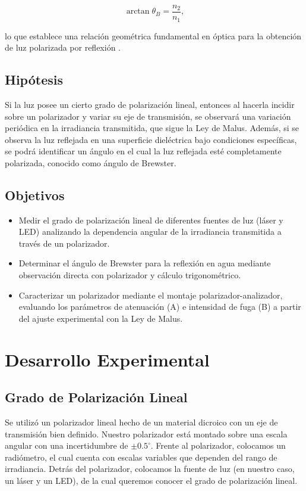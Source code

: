 \documentclass[article,12pt]{elsarticle}
\begin{document}
\begin{mdframed}
\begin{equation}
    \arctan \theta_B = \frac{n_2}{n_1},
\end{equation}
\end{mdframed}

lo que establece una relación geométrica fundamental en óptica para la obtención de luz polarizada por reflexión \cite{griffiths1999, Polarizacion}.

\subsection{Hipótesis}
Si la luz posee un cierto grado de polarización lineal, entonces al hacerla incidir sobre un polarizador y variar su eje de transmisión, se observará una variación periódica en la irradiancia transmitida, que sigue la Ley de Malus. Además, si se observa la luz reflejada en una superficie dieléctrica bajo condiciones específicas, se podrá identificar un ángulo en el cual la luz reflejada esté completamente polarizada, conocido como ángulo de Brewster.

\subsection{Objetivos}
\begin{itemize}
    \item Medir el grado de polarización lineal de diferentes fuentes de luz (láser y LED) analizando la dependencia angular de la irradiancia transmitida a través de un polarizador.
    \item Determinar el ángulo de Brewster para la reflexión en agua mediante observación directa con polarizador y cálculo trigonométrico.
    \item Caracterizar un polarizador mediante el montaje polarizador-analizador, evaluando los parámetros de atenuación (A) e intensidad de fuga (B) a partir del ajuste experimental con la Ley de Malus.
\end{itemize}


\section{Desarrollo Experimental}

\subsection{Grado de Polarización Lineal}
Se utilizó un polarizador lineal hecho de un material dicroico con un eje de transmisión bien definido. Nuestro polarizador está montado sobre una escala angular con una incertidumbre de $\pm 0.5^\circ$. Frente al polarizador, colocamos un radiómetro, el cual cuenta con escalas variables que dependen del rango de irradiancia. Detrás del polarizador, colocamos la fuente de luz (en nuestro caso, un láser y un LED), de la cual queremos conocer el grado de polarización lineal.
\end{document}
